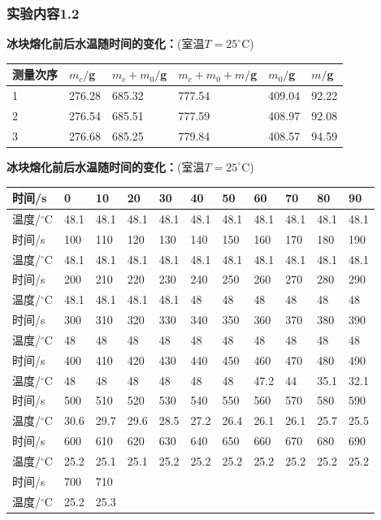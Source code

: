 \documentclass[dvipsnames, svgnames,a4paper,11pt]{article}
\begin{document}
\subsubsection{实验内容1.2}
{\bf 冰块熔化前后水温随时间的变化：}(室温$T=25^\circ$C)
\begin{table}[!h]
	\renewcommand\arraystretch{1.7}
	\centering
	\begin{tabularx}{\textwidth}{|X|X|X|X|X|X|}
	\hline
	测量次序& $m_c/$g &$m_c+m_0/$g& $m_c+m_0+m/$g&$m_0/$g&$m/$g \\
	\hline
	1&276.28&685.32&777.54&409.04&92.22\\
	\hline
	2&276.54&685.51&777.59&408.97&92.08\\
	\hline
	3&276.68&685.25&779.84&408.57&94.59\\
	\hline
	\end{tabularx}
\end{table}\par
{\bf 冰块熔化前后水温随时间的变化：}(室温$T=25^\circ$C)
\begin{table}[!h]
    \centering
    \begin{tabular}{|l|l|l|l|l|l|l|l|l|l|l|}
    \hline
        时间/s & 0 & 10 & 20 & 30 & 40 & 50 & 60 & 70 & 80 & 90 \\ \hline
        温度/$^\circ$C& 48.1 & 48.1 & 48.1 & 48.1 & 48.1 & 48.1 & 48.1 & 48.1 & 48.1 & 48.1 \\ \hline
        时间/s & 100 & 110 & 120 & 130 & 140 & 150 & 160 & 170 & 180 & 190 \\ \hline
        温度/$^\circ$C & 48.1 & 48.1 & 48.1 & 48.1 & 48.1 & 48.1 & 48.1 & 48.1 & 48.1 & 48.1 \\ \hline
        时间/s & 200 & 210 & 220 & 230 & 240 & 250 & 260 & 270 & 280 & 290 \\ \hline
        温度/$^\circ$C & 48.1 & 48.1 & 48.1 & 48.1 & 48 & 48 & 48 & 48 & 48 & 48 \\ \hline
        时间/s & 300 & 310 & 320 & 330 & 340 & 350 & 360 & 370 & 380 & 390 \\ \hline
        温度/$^\circ$C & 48 & 48 & 48 & 48 & 48 & 48 & 48 & 48 & 48 & 48 \\ \hline
        时间/s & 400 & 410 & 420 & 430 & 440 & 450 & 460 & 470 & 480 & 490 \\ \hline
        温度/$^\circ$C & 48 & 48 & 48 & 48 & 48 & 48 & 47.2 & 44 & 35.1 & 32.1 \\ \hline
        时间/s & 500 & 510 & 520 & 530 & 540 & 550 & 560 & 570 & 580 & 590 \\ \hline
        温度/$^\circ$C & 30.6 & 29.7 & 29.6 & 28.5 & 27.2 & 26.4 & 26.1 & 26.1 & 25.7 & 25.5 \\ \hline
        时间/s & 600 & 610 & 620 & 630 & 640 & 650 & 660 & 670 & 680 & 690 \\ \hline
        温度/$^\circ$C & 25.2 & 25.1 & 25.1 & 25.2 & 25.2 & 25.2 & 25.2 & 25.2 & 25.2 & 25.2 \\ \hline
        时间/s & 700 & 710 & ~ & ~ & ~ & ~ & ~ & ~ & ~ & ~ \\ \hline
        温度/$^\circ$C & 25.2 & 25.3 & ~ & ~ & ~ & ~ & ~ & ~ & ~ & ~ \\ \hline
    \end{tabular}
\end{table}
\end{document}
